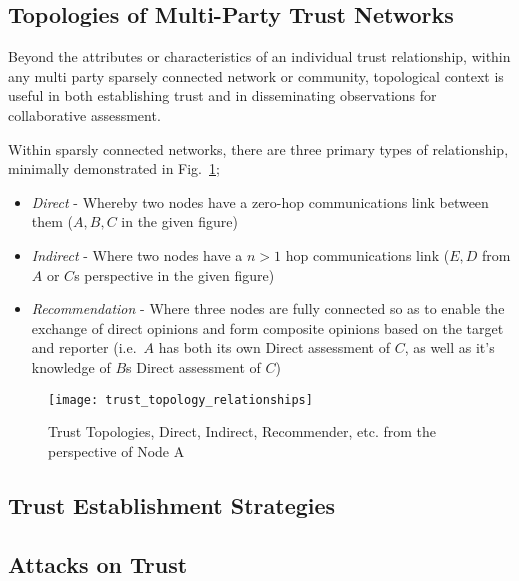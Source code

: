 \subsection{Topologies of Multi-Party Trust Networks}
\label{sec:trust_topologies}
Beyond the attributes or characteristics of an individual trust relationship, within any multi party sparsely  connected network or community, topological context is useful in both establishing trust and in disseminating observations for collaborative assessment.

Within sparsly connected networks, there are three primary types of relationship, minimally demonstrated in Fig.~\ref{fig:trust_topology_relationships};

\begin{itemize}
  \item \emph{Direct} - Whereby two nodes have a zero-hop communications link between them ($A,B,C$ in the given figure)
  \item \emph{Indirect} - Where two nodes have a $n>1$ hop communications link ($E,D$ from $A$ or $C$s perspective in the given figure)
  \item \emph{Recommendation} -  Where three nodes are fully connected so as to enable the exchange of direct opinions and form composite opinions based on the target and reporter (i.e.\ $A$ has both its own Direct assessment of $C$, as well as it's knowledge of $B$s Direct assessment of $C$)
\end{itemize}

\begin{figure}
  \texttt{[image: trust\_topology\_relationships]}
  \caption{Trust Topologies, Direct, Indirect, Recommender, etc. from the perspective of Node A}
  \label{fig:trust_topology_relationships}
\end{figure}

\subsection{Trust Establishment Strategies}


\subsection{Attacks on Trust}

